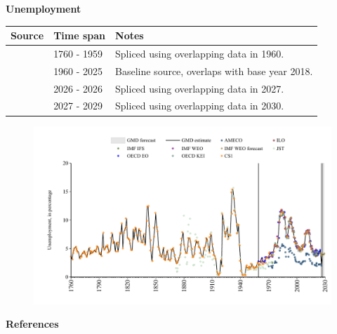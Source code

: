 \documentclass[12pt,a4paper,landscape]{article}
\begin{document}
\begin{adjustbox}{max totalsize={\paperwidth}{\paperheight},center}
\begin{minipage}[t][\textheight][t]{\textwidth}
\vspace*{0.5cm}
{}
\begin{center}
{\Large\bfseries Unemployment}
\end{center}
\vspace{0.5cm}
\begin{table}[H]
\centering
\small
\begin{tabular}{|l|l|l|}
\hline
\textbf{Source} & \textbf{Time span} & \textbf{Notes} \\
\hline
\rowcolor{white}\cite{CS1_GBR}& 1760 - 1959 &Spliced using overlapping data in 1960. \\
\rowcolor{lightgray}\cite{OECD_EO}& 1960 - 2025 &Baseline source, overlaps with base year 2018. \\
\rowcolor{white}\cite{AMECO}& 2026 - 2026 &Spliced using overlapping data in 2027. \\
\rowcolor{lightgray}\cite{IMF_WEO_forecast}& 2027 - 2029 &Spliced using overlapping data in 2030. \\
\hline
\end{tabular}
\end{table}
\begin{figure}[H]
\centering
\includegraphics[width=\textwidth,height=0.6\textheight,keepaspectratio]{graphs/GBR_unemp.pdf}
\end{figure}
\end{minipage}
\end{adjustbox}
{}
\begin{center}
{\Large\bfseries References}
\end{center}
\small


\end{document}
